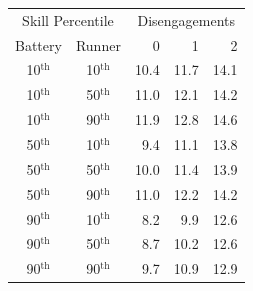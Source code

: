 \begin{tabular}{cc|rrr}
\multicolumn{2}{c|}{Skill Percentile} & \multicolumn{3}{c}{Disengagements}\\
Battery & Runner & 0 & 1 & 2 \\
  \hline
10$^\text{th}$ & 10$^\text{th}$ & 10.4 & 11.7 & 14.1 \\ 
  10$^\text{th}$ & 50$^\text{th}$ & 11.0 & 12.1 & 14.2 \\ 
  10$^\text{th}$ & 90$^\text{th}$ & 11.9 & 12.8 & 14.6 \\ 
   \hline
50$^\text{th}$ & 10$^\text{th}$ & 9.4 & 11.1 & 13.8 \\ 
  50$^\text{th}$ & 50$^\text{th}$ & 10.0 & 11.4 & 13.9 \\ 
  50$^\text{th}$ & 90$^\text{th}$ & 11.0 & 12.2 & 14.2 \\ 
   \hline
90$^\text{th}$ & 10$^\text{th}$ & 8.2 & 9.9 & 12.6 \\ 
  90$^\text{th}$ & 50$^\text{th}$ & 8.7 & 10.2 & 12.6 \\ 
  90$^\text{th}$ & 90$^\text{th}$ & 9.7 & 10.9 & 12.9 \\ 
\end{tabular}
